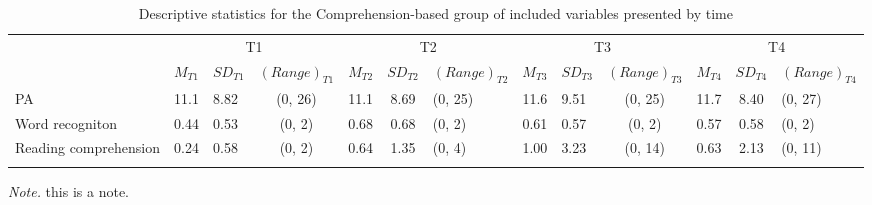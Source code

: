 \documentclass[
]{article}
\begin{document}
\begin{table}[tbp]

\begin{center}
\begin{threeparttable}

\caption{\label{tab:desc-read-animega-table}Descriptive statistics for the Comprehension-based group of included variables presented by time}

\small{

\begin{tabular}{lclclclclclcl}
\toprule
 & \multicolumn{3}{c}{T1} & \multicolumn{3}{c}{T2} & \multicolumn{3}{c}{T3} & \multicolumn{3}{c}{T4} \\
\cmidrule(r){2-4} \cmidrule(r){5-7} \cmidrule(r){8-10} \cmidrule(r){11-13}
  & $M_{T1}$ & $SD_{T1}$ & $(Range)_{T1}$ & $M_{T2}$ & $SD_{T2}$ & $(Range)_{T2}$ & $M_{T3}$ & $SD_{T3}$ & $(Range)_{T3}$ & $M_{T4}$ & $SD_{T4}$ & $(Range)_{T4}$\\
\midrule
PA & 11.1 & 8.82 & (0, 26) & 11.1 & 8.69 & (0, 25) & 11.6 & 9.51 & (0, 25) & 11.7 & 8.40 & (0, 27)\\
Word recogniton & 0.44 & 0.53 & (0, 2) & 0.68 & 0.68 & (0, 2) & 0.61 & 0.57 & (0, 2) & 0.57 & 0.58 & (0, 2)\\
Reading comprehension & 0.24 & 0.58 & (0, 2) & 0.64 & 1.35 & (0, 4) & 1.00 & 3.23 & (0, 14) & 0.63 & 2.13 & (0, 11)\\
\bottomrule
\addlinespace
\end{tabular}

}

\begin{tablenotes}[para]
\normalsize{\textit{Note.} this is a note.}
\end{tablenotes}

\end{threeparttable}
\end{center}

\end{table}
\end{document}
